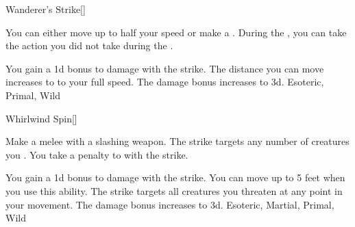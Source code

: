 \lowercase{\hypertarget{maneuver:Wanderer's Strike}{}}\label{maneuver:Wanderer's Strike}
\hypertarget{maneuver:Wanderer's Strike}{}
\begin{freeability}[Rank 1]{Wanderer's Strike}[]

You can either move up to half your speed or make a .
During the , you can take the action you did not take during the .

\rankline
{} You gain a \plus1d bonus to damage with the strike.
 The distance you can move increases to to your full speed.
 The damage bonus increases to \plus3d.
 Esoteric, Primal, Wild
\end{freeability}
\vspace{0.25em}



\lowercase{\hypertarget{maneuver:Whirlwind Spin}{}}\label{maneuver:Whirlwind Spin}
\hypertarget{maneuver:Whirlwind Spin}{}
\begin{freeability}[Rank 1]{Whirlwind Spin}[]

Make a melee  with a slashing weapon.
The strike targets any number of creatures you .
You take a  penalty to  with the strike.

\rankline
{} You gain a \plus1d bonus to damage with the strike.
 You can move up to 5 feet when you use this ability.
The strike targets all creatures you threaten at any point in your movement.
 The damage bonus increases to \plus3d.
 Esoteric, Martial, Primal, Wild
\end{freeability}
\vspace{0.25em}


